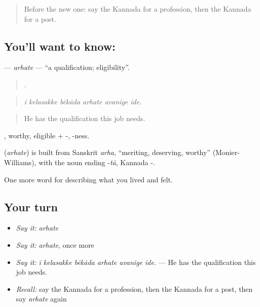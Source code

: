 \label{lesson:KA-C516-arhate}



\begin{quote}
Before the new one: say the Kannada for a profession, then the Kannada for a post.
\end{quote}

\subsection*{You'll want to know: }
\textbf{} — \emph{arhate} — \textquotedblleft{}a qualification; eligibility\textquotedblright{}.

\begin{quote}
     .
\end{quote}

\begin{quote}
\emph{ī kelasakke bēkāda arhate avanige ide.}
\end{quote}

\begin{quote}
He has the qualification this job needs.
\end{quote}

, worthy, eligible + -, -ness.

\begin{cousinweb}
\textbf{} (\emph{arhate}) is built from Sanskrit \emph{arha}, \textquotedblleft{}meriting, deserving, worthy\textquotedblright{} (Monier-Williams), with the noun ending -\emph{tā}, Kannada -.
\end{cousinweb}

\begin{grammarlens}[title={What you've built}]
One more word for describing what you lived and felt.
\end{grammarlens}

\subsection*{Your turn}
\begin{itemize}
\raggedright
  \item \emph{Say it:} \emph{arhate}
  \item \emph{Say it:} \emph{arhate}, once more
  \item \emph{Say it:} \emph{ī kelasakke bēkāda arhate avanige ide.} — He has the qualification this job needs.
  \item \emph{Recall:} say the Kannada for a profession, then the Kannada for a post, then say \emph{arhate} again
\end{itemize}

